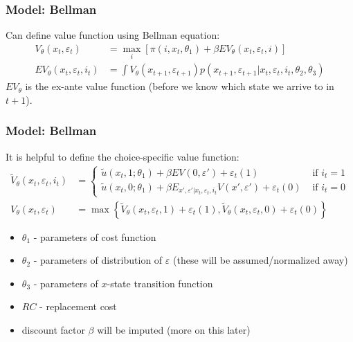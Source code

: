 \documentclass[xcolor=pdftex,dvipsnames,table,mathserif,aspectratio=169]{beamer}
\begin{document}
\begin{frame}
\frametitle{Model: Bellman}
 Can define value function using Bellman equation:
 \begin{align*}
		V_{\theta}\left(x_{t},\varepsilon_{t}\right) &= \max_{i} \left[ \pi \left(i,x_{t},\theta_1 \right) +
		\beta EV_{\theta}\left(x_{t},\varepsilon_{t},i \right) \right]\\
	 EV_{\theta}\left(x_{t},\varepsilon_{t},i_{t}\right) &=\int V_{\theta}\left(x_{t+1},\varepsilon_{t+1}\right) p\left(x_{t+1}, \varepsilon_{t+1} |x_{t},\varepsilon_{t},i_{t},\theta_{2},\theta_{3}\right)
\end{align*}
$EV_{\theta}$ is the \alert{ex-ante value function} (before we know which state we arrive to in $t+1$).
\end{frame}




\begin{frame}
\frametitle{Model: Bellman}
It is helpful to define the \alert{choice-specific value function}:
\begin{align*}
\tilde V_{\theta} (x_t, \varepsilon_t, i_t) &= \left \{ 
\begin{array}{lr}
\tilde u(x_t, 1;\theta_1) + \beta EV(0, \varepsilon ') + \varepsilon_{t}(1) & \text{ if } i_t = 1 \\
\tilde u(x_t , 0; \theta_1) + \beta E_{x', \varepsilon ' | x_t, \varepsilon_t, i_t} V(x', \varepsilon ')  + \varepsilon_{t}(0)  & \text{ if } i_t = 0
\end{array}
\right .\\
V_{\theta}(x_t,\varepsilon_t) &= \max \left\{ \tilde V_{\theta} (x_t, \varepsilon_t, 1) + \varepsilon_{t}(1) ,\tilde V_{\theta} (x_t, \varepsilon_t, 0) + \varepsilon_{t}(0) \right\}
\end{align*}
\begin{itemize}
	\item $\theta_{1}$ - parameters of cost function
	\item $\theta_{2}$ - parameters of distribution of $\varepsilon$ (these will be assumed/normalized away)
	\item $\theta_{3}$ - parameters of $x$-state transition function
	\item $RC$ - replacement cost
	\item discount factor $\beta$ will be imputed (more on this later)
\end{itemize}
\end{frame}
\end{document}
